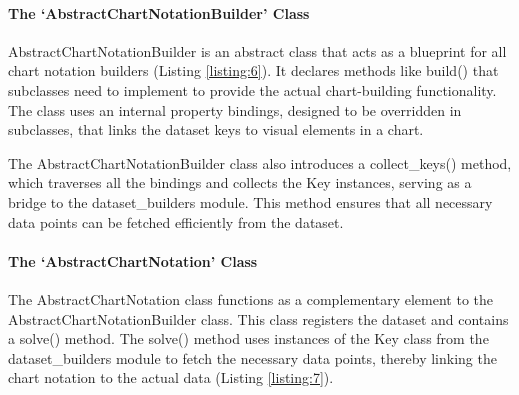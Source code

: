 \paragraph{The `AbstractChartNotationBuilder'
Class}\label{the-abstractchartnotationbuilder-class}

AbstractChartNotationBuilder is an abstract class that acts as a
blueprint for all chart notation builders (Listing \ref{listing:6}). It declares
methods like build() that subclasses need to implement to
provide the actual chart-building functionality. The class uses an
internal property bindings, designed to be overridden in subclasses,
that links the dataset keys to visual elements in a chart.

The AbstractChartNotationBuilder class also introduces a collect\_keys()
method, which traverses all the bindings and collects the Key instances,
serving as a bridge to the dataset\_builders module. This method ensures
that all necessary data points can be fetched efficiently from the
dataset.


\paragraph{The `AbstractChartNotation'
Class}\label{the-abstractchartnotation-class}

The AbstractChartNotation class functions as a complementary element to
the AbstractChartNotationBuilder class. This class registers the dataset
and contains a solve() method. The solve() method uses instances of the
Key class from the dataset\_builders module to fetch the necessary data
points, thereby linking the chart notation to the actual data (Listing
\ref{listing:7}).

